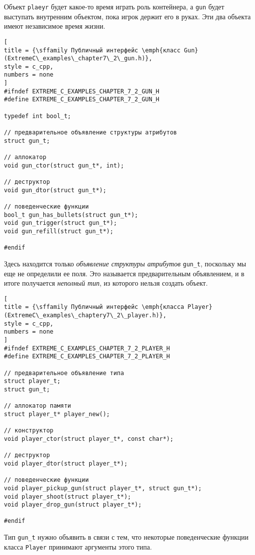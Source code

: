 \documentclass[%
	11pt,
	a4paper,
	utf8,
		]{article}
\begin{document}
Объект \verb|plaeyr| будет какое-то время играть роль контейнера, а \verb|gun| будет выступать внутренним объектом, пока игрок держит его в руках. Эти два объекта имеют независимое время жизни.
\begin{lstlisting}[
title = {\sffamily Публичный интерфейс \emph{класс Gun} (ExtremeC\_examples\_chapter7\_2\_gun.h)},
style = c_cpp,
numbers = none
]
#ifndef EXTREME_C_EXAMPLES_CHAPTER_7_2_GUN_H
#define EXTREME_C_EXAMPLES_CHAPTER_7_2_GUN_H

typedef int bool_t;

// предварительное объявление структуры атрибутов
struct gun_t;

// аллокатор
void gun_ctor(struct gun_t*, int);

// деструктор
void gun_dtor(struct gun_t*);

// поведенческие функции
bool_t gun_has_bullets(struct gun_t*);
void gun_trigger(struct gun_t*);
void gun_refill(struct gun_t*);

#endif
\end{lstlisting}

Здесь находится только \emph{объявление структуры атрибутов} \verb|gun_t|, поскольку мы еще не определили ее поля. Это называется предварительным объявлением, и в итоге получается \emph{неполный тип}, из которого нельзя создать объект.

\begin{lstlisting}[
title = {\sffamily Публичный интерфейс \emph{класса Player} (ExtremeC\_examples\_chaptery7\_2\_player.h)},
style = c_cpp,
numbers = none
]
#ifndef EXTREME_C_EXAMPLES_CHAPTER_7_2_PLAYER_H
#define EXTREME_C_EXAMPLES_CHAPTER_7_2_PLAYER_H

// предварительное объявление типа
struct player_t;
struct gun_t;

// аллокатор памяти
struct player_t* player_new();

// конструктор
void player_ctor(struct player_t*, const char*);

// деструктор
void player_dtor(struct player_t*);

// поведенческие функции
void player_pickup_gun(struct player_t*, struct gun_t*);
void player_shoot(struct player_t*);
void player_drop_gun(struct player_t*);

#endif
\end{lstlisting}

Тип \verb|gun_t| нужно объявить в связи с тем, что некоторые поведенческие функции класса \verb|Player| принимают аргументы этого типа.
\end{document}
